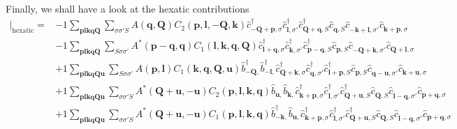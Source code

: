 Finally, we shall have a look at the hexatic contributions
\begin{align*}
	[\eta, H'] \vert_\mathrm{hexatic} = 	&-1 \sum_{ \mathbf{p} \mathbf{l} \mathbf{k} \mathbf{q} \mathbf{Q} } \sum_{ \sigma \sigma' S } A( \mathbf{q}, \mathbf{Q} )  C_2( \mathbf{p}, \mathbf{l}, -\mathbf{Q}, \mathbf{k} )   \hat{c}_{ -\mathbf{Q}+\mathbf{p}, \sigma }^\dagger  \hat{c}_{ \mathbf{l}, \sigma' }^\dagger  \hat{c}_{ \mathbf{Q}+\mathbf{q}, S }^\dagger  \hat{c}_{ \mathbf{q}, S }^{\phantom{\dagger}} \hat{c}_{ -\mathbf{k}+\mathbf{l}, \sigma' }^{\phantom{\dagger}} \hat{c}_{ \mathbf{k}+\mathbf{p}, \sigma }^{\phantom{\dagger}}  \\
	&-1 \sum_{ \mathbf{p} \mathbf{l} \mathbf{k} \mathbf{q} \mathbf{Q} } \sum_{ S \sigma \sigma' } A^*( \mathbf{p}-\mathbf{q}, \mathbf{q} )  C_1( \mathbf{l}, \mathbf{k}, \mathbf{q}, \mathbf{Q} )   \hat{c}_{ \mathbf{l}+\mathbf{q}, \sigma }^\dagger  \hat{c}_{ \mathbf{k}, \sigma' }^\dagger  \hat{c}_{ \mathbf{p}-\mathbf{q}, S }^\dagger  \hat{c}_{ \mathbf{p}, S }^{\phantom{\dagger}} \hat{c}_{ -\mathbf{Q}+\mathbf{k}, \sigma' }^{\phantom{\dagger}} \hat{c}_{ \mathbf{Q}+\mathbf{l}, \sigma }^{\phantom{\dagger}}  \\
	&+1 \sum_{ \mathbf{p} \mathbf{l} \mathbf{k} \mathbf{q} \mathbf{Q} \mathbf{u} } \sum_{ S \sigma \sigma' } A( \mathbf{p}, \mathbf{l} )  C_1( \mathbf{k}, \mathbf{q}, \mathbf{Q}, \mathbf{u} )   \hat{b}_{ -\mathbf{Q}, }^\dagger  \hat{b}_{ -\mathbf{l}, }^\dagger  \hat{c}_{ \mathbf{Q}+\mathbf{k}, \sigma }^\dagger  \hat{c}_{ \mathbf{q}, \sigma' }^\dagger  \hat{c}_{ \mathbf{l}+\mathbf{p}, S }^\dagger  \hat{c}_{ \mathbf{p}, S }^{\phantom{\dagger}} \hat{c}_{ \mathbf{q}-\mathbf{u}, \sigma' }^{\phantom{\dagger}} \hat{c}_{ \mathbf{k}+\mathbf{u}, \sigma }^{\phantom{\dagger}}  \\
	&+1 \sum_{ \mathbf{p} \mathbf{l} \mathbf{k} \mathbf{q} \mathbf{Q} \mathbf{u} } \sum_{ \sigma \sigma' S } A^*( \mathbf{Q}+\mathbf{u}, -\mathbf{u} )  C_2( \mathbf{p}, \mathbf{l}, \mathbf{k}, \mathbf{q} )   \hat{b}_{ \mathbf{u}, }^{\phantom{\dagger}} \hat{b}_{ \mathbf{k}, }^{\phantom{\dagger}} \hat{c}_{ \mathbf{k}+\mathbf{p}, \sigma }^\dagger  \hat{c}_{ \mathbf{l}, \sigma' }^\dagger  \hat{c}_{ \mathbf{Q}+\mathbf{u}, S }^\dagger  \hat{c}_{ \mathbf{Q}, S }^{\phantom{\dagger}} \hat{c}_{ \mathbf{l}-\mathbf{q}, \sigma' }^{\phantom{\dagger}} \hat{c}_{ \mathbf{p}+\mathbf{q}, \sigma }^{\phantom{\dagger}}  \\
	&+1 \sum_{ \mathbf{p} \mathbf{l} \mathbf{k} \mathbf{q} \mathbf{Q} \mathbf{u} } \sum_{ \sigma \sigma' S } A^*( \mathbf{Q}+\mathbf{u}, -\mathbf{u} )  C_1( \mathbf{p}, \mathbf{l}, \mathbf{k}, \mathbf{q} )   \hat{b}_{ -\mathbf{k}, }^\dagger  \hat{b}_{ \mathbf{u}, }^{\phantom{\dagger}} \hat{c}_{ \mathbf{k}+\mathbf{p}, \sigma }^\dagger  \hat{c}_{ \mathbf{l}, \sigma' }^\dagger  \hat{c}_{ \mathbf{Q}+\mathbf{u}, S }^\dagger  \hat{c}_{ \mathbf{Q}, S }^{\phantom{\dagger}} \hat{c}_{ \mathbf{l}-\mathbf{q}, \sigma' }^{\phantom{\dagger}} \hat{c}_{ \mathbf{p}+\mathbf{q}, \sigma }^{\phantom{\dagger}}  \\

\end{align*}
